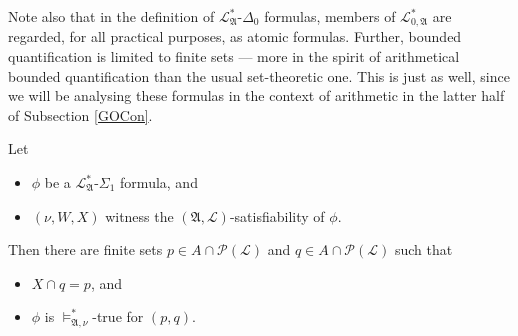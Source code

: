 \documentclass[12pt]{article}
\numberwithin{equation}{section}
\begin{document}
Note also that in the definition of $\mathcal{L}^{*}_{\mathfrak{A}}$-$\Delta_0$ formulas, members of $\mathcal{L}^{*}_{0, \mathfrak{A}}$ are regarded, for all practical purposes, as atomic formulas. Further, bounded quantification is limited to finite sets --- more in the spirit of arithmetical bounded quantification than the usual set-theoretic one. This is just as well, since we will be analysing these formulas in the context of arithmetic in the latter half of Subsection \ref{GOCon}.

\begin{lem}\label{exist}
Let 
\begin{itemize}
    \item $\phi$ be a $\mathcal{L}^{*}_{\mathfrak{A}}$-$\Sigma_1$ formula, and
    \item $(\nu, W, X)$ witness the $(\mathfrak{A}, \mathcal{L})$-satisfiability of $\phi$.
\end{itemize}
Then there are finite sets $p \in A \cap \mathcal{P}(\mathcal{L})$ and $q \in A \cap \mathcal{P}(\mathcal{L})$ such that 
\begin{itemize}
    \item $X \cap q = p$, and
    \item $\phi$ is $\models^*_{\mathfrak{A}, \nu}$-true for $(p, q)$.
\end{itemize}
\end{lem}
\end{document}
